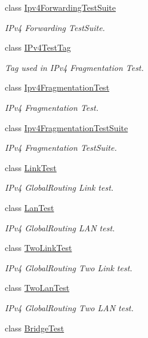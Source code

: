 \begin{DoxyCompactItemize}
class \hyperlink{classIpv4ForwardingTestSuite}{Ipv4\+Forwarding\+Test\+Suite}
\begin{DoxyCompactList}\small\item\em I\+Pv4 Forwarding Test\+Suite. \end{DoxyCompactList}\item 
class \hyperlink{classIPv4TestTag}{I\+Pv4\+Test\+Tag}
\begin{DoxyCompactList}\small\item\em Tag used in I\+Pv4 Fragmentation Test. \end{DoxyCompactList}\item 
class \hyperlink{classIpv4FragmentationTest}{Ipv4\+Fragmentation\+Test}
\begin{DoxyCompactList}\small\item\em I\+Pv4 Fragmentation Test. \end{DoxyCompactList}\item 
class \hyperlink{classIpv4FragmentationTestSuite}{Ipv4\+Fragmentation\+Test\+Suite}
\begin{DoxyCompactList}\small\item\em I\+Pv4 Fragmentation Test\+Suite. \end{DoxyCompactList}\item 
class \hyperlink{classLinkTest}{Link\+Test}
\begin{DoxyCompactList}\small\item\em I\+Pv4 Global\+Routing Link test. \end{DoxyCompactList}\item 
class \hyperlink{classLanTest}{Lan\+Test}
\begin{DoxyCompactList}\small\item\em I\+Pv4 Global\+Routing L\+AN test. \end{DoxyCompactList}\item 
class \hyperlink{classTwoLinkTest}{Two\+Link\+Test}
\begin{DoxyCompactList}\small\item\em I\+Pv4 Global\+Routing Two Link test. \end{DoxyCompactList}\item 
class \hyperlink{classTwoLanTest}{Two\+Lan\+Test}
\begin{DoxyCompactList}\small\item\em I\+Pv4 Global\+Routing Two L\+AN test. \end{DoxyCompactList}\item 
class \hyperlink{classBridgeTest}{Bridge\+Test}

\end{DoxyCompactItemize}
